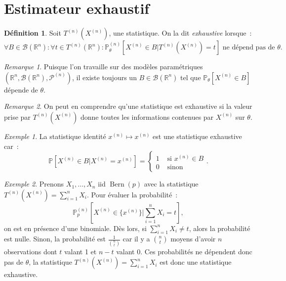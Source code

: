 \documentclass{report}
\DeclareMathOperator{\Bern}{Bern}  %
\renewcommand{\P}{\mathbb P}
\newcommand{\statmod}[4]{\left(#1^{#4}, #2\left(#1^{#4}\right), #3^{\left(#4\right)}\right)}
\newcommand{\R}{\mathbb R}
\newcommand{\Brl}{\mathcal B}  %
\theoremstyle{definition}
\newtheorem{déf}[thm]{Définition}
\theoremstyle{remark}
\newtheorem*{rmq}{Remarque}
\newtheorem{ex}{Exemple}[chapter]
\begin{document}
	\section{Estimateur exhaustif}
		\begin{déf} Soit $T^{(n)}(X^{(n)})$, une statistique. On la dit \textit{exhaustive} lorsque~:
		\[\forall B \in \Brl(\R^n) : \forall t \in T^{(n)}(\R^n) : \P_\theta^{(n)}\left[X^{(n)} \in B | T^{(n)}(X^{(n)}) = t\right] \text{ ne dépend pas de } \theta.\]
		\end{déf}
		
		\begin{rmq} Puisque l'on travaille sur des modèles paramétriques $\statmod \R\Brl{\mathcal P}n$, il existe toujours un $B \in \Brl(\R^n)$ tel que
		$\P_\theta[X^{(n)} \in B]$ dépende de $\theta$.
		\end{rmq}
		
		\begin{rmq} On peut en comprendre qu'une statistique est exhaustive si la valeur prise par $T^{(n)}(X^{(n)})$ donne toutes les informations contenues par
		$X^{(n)}$ sur $\theta$. 
		\end{rmq}
		
		\begin{ex} La statistique identité $x^{(n)} \mapsto x^{(n)}$ est une statistique exhaustive car~:
		\[\P\left[X^{(n)} \in B | X^{(n)} = x^{(n)}\right] =  \begin{cases}1 &\text{ si } x^{(n)} \in B \\0 &\text{ sinon}\end{cases}.\]
		\end{ex}
		
		\begin{ex} Prenons $X_1, \ldots, X_n$ iid $\Bern(p)$ avec la statistique $T^{(n)}(X^{(n)}) = \sum_{i=1}^nX_i$. Pour évaluer la probabilité~:
		\[\P_p^{(n)}\left[X^{(n)} \in \{x^{(n)}\} | \sum_{i=1}^nX_i = t\right],\]
		on est en présence d'une binomiale. Dès lors, si $\sum_{i=1}^nX_i \neq t$, alors la probabilité est nulle. Sinon, la probabilité est $\frac 1{\binom nt}$ car
		il y a $\binom nt$ moyens d'avoir $n$ observations dont $t$ valant 1 et $n-t$ valant 0. Ces probabilités ne dépendent donc pas de $\theta$, la statistique
		$T^{(n)}(X^{(n)}) = \sum_{i=1}^nX_i$ est donc une statistique exhaustive.
		\end{ex}
\end{document}
